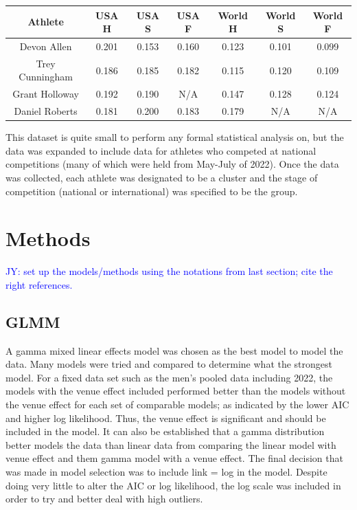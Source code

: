 \documentclass[12pt, letterpaper, titlepage]{article}
\newcommand{\jy}[1]{\textcolor{blue}{JY: #1}}
\begin{document}
\begin{center}
  \begin{tabular}{|c c c c c c c|} 
   \hline
   Athlete & USA H & USA S & USA F & World H & World S & World F \\ [0.5ex] 
   \hline\hline
   Devon Allen & 0.201 & 0.153 & 0.160 & 0.123 & 0.101 & 0.099 \\ 
   \hline
   Trey Cunningham & 0.186 & 0.185 & 0.182 & 0.115 & 0.120 & 0.109 \\
   \hline
   Grant Holloway & 0.192 & 0.190 & N/A & 0.147 & 0.128 & 0.124 \\
   \hline
   Daniel Roberts & 0.181 & 0.200 & 0.183 & 0.179 & N/A & N/A \\ [0.5ex]
   \hline
  \end{tabular}
  \end{center}

This dataset is quite small to perform any formal statistical analysis on, but
the data was expanded to include data for athletes who competed at national
competitions (many of which were held from May-July of 2022).  Once the data
was collected, each athlete was designated to be a cluster and the stage of
competition (national or international) was specified to be the group. 

\section{Methods} \label{sec:meth}

\jy{set up the models/methods using the notations from last section; cite the
  right references.}

\subsection{GLMM}
A gamma mixed linear effects model was chosen as the best model to model the data.
Many models were tried and compared to determine what the strongest model.  For
a fixed data set such as the men's pooled data including 2022, the models with
the venue effect included performed better than the models without the venue
effect for each set of comparable models; as indicated by the lower AIC and
higher log likelihood.  Thus, the venue effect is significant and should be
included in the model.  It can also be established that a gamma distribution
better models the data than linear data from comparing the linear model with
venue effect and them gamma model with a venue effect.  The final decision that
was made in model selection was to include link = log in the model.  Despite
doing very little to alter the AIC or log likelihood, the log scale was included
in order to try and better deal with high outliers. %
\end{document}
